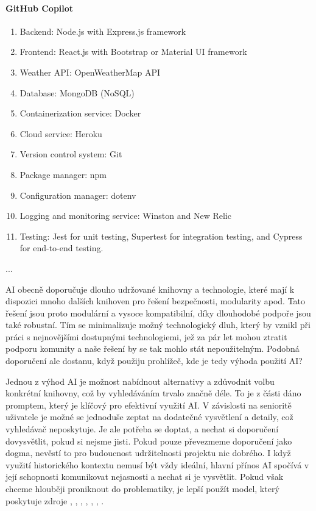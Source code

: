 \documentclass[FM,DP]{tulthesis}
\begin{document}
\begin{tcolorbox}[colback=white,colframe=black]
			\vspace{0.6em}
			
			
			\paragraph{GitHub Copilot}
			\begin{enumerate}
				\item Backend: Node.js with Express.js framework
				\item Frontend: React.js with Bootstrap or Material UI framework
				\item Weather API: OpenWeatherMap API
				\item Database: MongoDB (NoSQL)
				\item Containerization service: Docker
				\item Cloud service: Heroku
				\item Version control system: Git
				\item Package manager: npm
				\item Configuration manager: dotenv
				\item Logging and monitoring service: Winston and New Relic
				\item Testing: Jest for unit testing, Supertest for integration testing, and Cypress for end-to-end testing.
			\end{enumerate}
			... \cite{gitCopilot_navrh}
		\end{tcolorbox}
		\vspace{0.6em}
		
		AI obecně doporučuje dlouho udržované knihovny a technologie, které mají k dispozici mnoho dalších knihoven pro řešení bezpečnosti, modularity apod. Tato řešení jsou proto modulární a vysoce kompatibilní, díky dlouhodobé podpoře jsou také robustní. Tím se minimalizuje možný technologický dluh, který by vznikl při práci s nejnovějšími dostupnými technologiemi, jež za pár let mohou ztratit podporu komunity a naše řešení by se tak mohlo stát nepoužitelným. Podobná doporučení ale dostanu, když použiju prohlížeč, kde je tedy výhoda použití AI?
		
		Jednou z výhod AI je možnost nabídnout alternativy a zdůvodnit volbu konkrétní knihovny, což by vyhledáváním trvalo značně déle. To je z části dáno promptem, který je klíčový pro efektivní využití AI. V závislosti na senioritě uživatele je možné se jednoduše zeptat na dodatečné vysvětlení a detaily, což vyhledávač neposkytuje. Je ale potřeba se doptat, a nechat si doporučení dovysvětlit, pokud si nejsme jisti. Pokud pouze převezmeme doporučení jako dogma, nevěstí to pro budoucnost udržitelnosti projektu nic dobrého. I když využití historického kontextu nemusí být vždy ideální, hlavní přínos AI spočívá v její schopnosti komunikovat nejasnosti a nechat si je vysvětlit. Pokud však chceme hlouběji proniknout do problematiky, je lepší použít model, který poskytuje zdroje \cite{claude_navrh}, \cite{chatgpt_navrh}, \cite{bard_navrh}, \cite{codellama_navrh}, \cite{falcon_navrh}, \cite{gitCopilot_navrh}, \cite{bingCopilot_navrh} \cite{perplexity}. 
		
\end{document}
